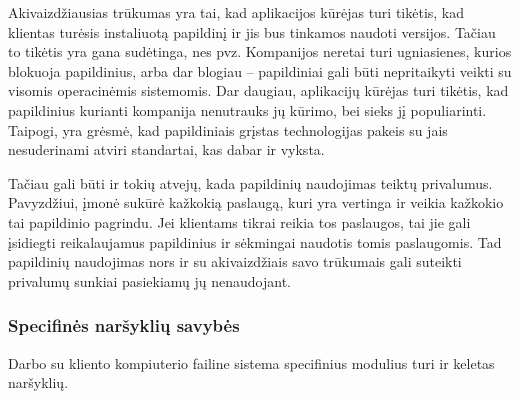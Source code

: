 \documentclass[12pt,a4paper,titlepage]{article}
\begin{document}
Akivaizdžiausias trūkumas yra tai, kad aplikacijos kūrėjas turi tikėtis, kad klientas turėsis instaliuotą papildinį ir jis bus tinkamos naudoti versijos. Tačiau to tikėtis yra gana sudėtinga, nes pvz. Kompanijos neretai turi ugniasienes, kurios blokuoja papildinius, arba dar blogiau – papildiniai gali būti nepritaikyti veikti su visomis operacinėmis sistemomis. Dar daugiau, aplikacijų kūrėjas turi tikėtis, kad papildinius kurianti kompanija nenutrauks jų kūrimo, bei sieks jį populiarinti. Taipogi, yra grėsmė, kad papildiniais grįstas technologijas pakeis su jais nesuderinami atviri standartai, kas dabar ir vyksta.

Tačiau gali būti ir tokių atvejų, kada papildinių naudojimas teiktų privalumus. Pavyzdžiui, įmonė sukūrė kažkokią paslaugą, kuri yra vertinga ir veikia kažkokio tai papildinio pagrindu. Jei klientams tikrai reikia tos paslaugos, tai jie gali įsidiegti reikalaujamus papildinius ir sėkmingai naudotis tomis paslaugomis. Tad papildinių naudojimas nors ir su akivaizdžiais savo trūkumais gali suteikti privalumų sunkiai pasiekiamų jų nenaudojant.

\subsubsection{Specifinės naršyklių savybės}

Darbo su kliento kompiuterio failine sistema specifinius modulius turi ir keletas naršyklių. 
\end{document}
